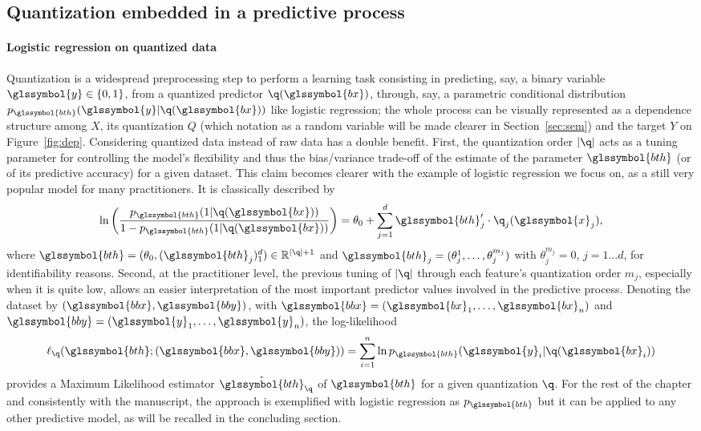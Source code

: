 \subsection{Quantization embedded in a predictive process}

\paragraph{Logistic regression on quantized data}

Quantization is a widespread preprocessing step to perform a learning task consisting in predicting, say, a binary variable $\glssymbol{y}\in\{0,1\}$, from a quantized predictor  $\q(\glssymbol{bx})$, through, say, a parametric conditional distribution $p_{\glssymbol{bth}}(\glssymbol{y}|\q(\glssymbol{bx}))$ like logistic regression; the whole process can be visually represented as a dependence structure among $X$, its quantization $Q$ (which notation as a random variable will be made clearer in Section~\ref{sec:sem}) and the target $Y$ on Figure~\ref{fig:dep}. Considering quantized data instead of raw data has a double benefit. First, the quantization order $|\q|$ acts as a tuning parameter for controlling the model's flexibility and thus the bias/variance trade-off of the estimate of the parameter $\glssymbol{bth}$ (or of its predictive accuracy) for a given dataset. This claim becomes clearer with the example of logistic regression we focus on, as a still very popular model for many practitioners. It is classically described by
\begin{equation}
    \label{eq:reglogq}
\ln \left( \dfrac{p_{\glssymbol{bth}}(1|\q(\glssymbol{bx}))}{1 - p_{\glssymbol{bth}}(1|\q(\glssymbol{bx}))} \right) = \theta_0 + \sum_{j=1}^d \glssymbol{bth}_j' \cdot \q_j(\glssymbol{x}_j),
\end{equation}
where $\glssymbol{bth} = (\theta_{0},(\glssymbol{bth}_j)_1^d) \in \mathbb{R}^{|\q|+1}$ and $\glssymbol{bth}_j = (\theta_{j}^{1},\dots,\theta_{j}^{m_j})$ with $\theta_{j}^{m_j} = 0$, $j=1 \ldots d$, for identifiability reasons.
Second, at the practitioner level, the previous tuning of $|\q|$ through each feature's quantization order $m_j$, especially when it is quite low, allows an easier interpretation of the most important predictor values involved in the predictive process. Denoting the dataset by $(\glssymbol{bbx},\glssymbol{bby})$, with $\glssymbol{bbx}=(\glssymbol{bx}_1,\ldots,\glssymbol{bx}_n)$ and $\glssymbol{bby}=(\glssymbol{y}_1,\ldots,\glssymbol{y}_n)$, the log-likelihood 
\begin{equation}
\label{eq:lq}
\ell_{\q}(\glssymbol{bth} ; (\glssymbol{bbx},\glssymbol{bby}))=\sum_{i=1}^n \ln p_{\glssymbol{bth}}(\glssymbol{y}_i|\q(\glssymbol{bx}_i))
\end{equation}
provides a Maximum Likelihood estimator $\hat{\glssymbol{bth}}_\q$ of $\glssymbol{bth}$ for a given quantization $\q$. For the rest of the chapter and consistently with the manuscript, the approach is exemplified with logistic regression as $p_{\glssymbol{bth}}$ but it can be applied to any other predictive model, as will be recalled in the concluding section.


